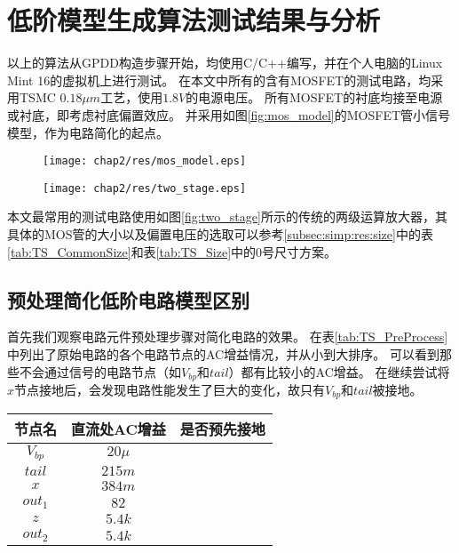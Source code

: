 \section{低阶模型生成算法测试结果与分析}
\label{sec:simp:res}

以上的算法从GPDD构造步骤开始，均使用C/C++编写，并在个人电脑的Linux Mint 16的虚拟机上进行测试。
在本文中所有的含有MOSFET的测试电路，均采用TSMC $0.18 \mu m$工艺，使用$1.8V$的电源电压。
所有MOSFET的衬底均接至电源或衬底，即考虑衬底偏置效应。
并采用如图\ref{fig:mos_model}的MOSFET管小信号模型，作为电路简化的起点。

\begin{figure}[!htp]
	\centering
	\texttt{[image: chap2/res/mos\_model.eps]}
\end{figure}

\begin{figure}[!htp]
	\centering
	\texttt{[image: chap2/res/two\_stage.eps]}
\end{figure}

本文最常用的测试电路使用如图\ref{fig:two_stage}所示的传统的两级运算放大器，其具体的MOS管的大小以及偏置电压的选取可以参考\ref{subsec:simp:res:size}中的表\ref{tab:TS_CommonSize}和表\ref{tab:TS_Size}中的0号尺寸方案。

\subsection{预处理简化低阶电路模型区别}
\label{subsec:simp:res:pre}

首先我们观察电路元件预处理步骤对简化电路的效果。
在表\ref{tab:TS_PreProcess}中列出了原始电路的各个电路节点的AC增益情况，并从小到大排序。
可以看到那些不会通过信号的电路节点（如$V_{bp}$和$tail$）都有比较小的AC增益。
在继续尝试将$x$节点接地后，会发现电路性能发生了巨大的变化，故只有$V_{bp}$和$tail$被接地。

\begin{table}[!htbp]
	\centering
	\begin{tabular}{c|c|c}
		\hline
		  节点名    & 直流处AC增益 &   是否预先接地   \\ \hline
		$V_{bp}$ & $20\mu$ & \checkmark \\
		 $tail$  & $215m$  & \checkmark \\
		  $x$    & $384m$  & \texttimes \\
		$out_1$  &  $82$   & \texttimes \\
		  $z$    & $5.4k$  & \texttimes \\
		$out_2$  & $5.4k$  & \texttimes \\ \hline
	\end{tabular}
\end{table}


